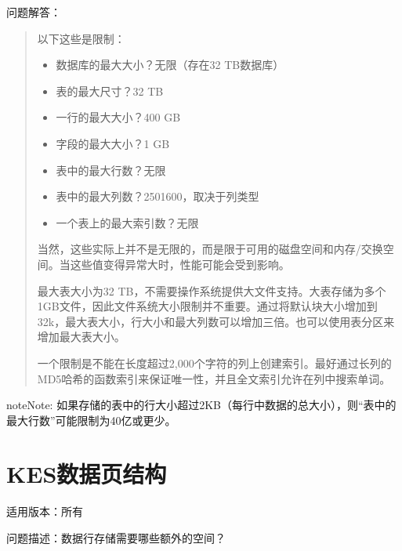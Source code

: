 \documentclass[a4,10pt,oneside,english]{sphinxmanual}
\begin{document}
问题解答：
\begin{quote}

以下这些是限制：
\begin{itemize}
\item {} 
数据库的最大大小？无限（存在32 TB数据库）

\item {} 
表的最大尺寸？32 TB

\item {} 
一行的最大大小？400 GB

\item {} 
字段的最大大小？1 GB

\item {} 
表中的最大行数？无限

\item {} 
表中的最大列数？250\sphinxhyphen{}1600，取决于列类型

\item {} 
一个表上的最大索引数？无限

\end{itemize}

当然，这些实际上并不是无限的，而是限于可用的磁盘空间和内存/交换空间。当这些值变得异常大时，性能可能会受到影响。

最大表大小为32 TB，不需要操作系统提供大文件支持。大表存储为多个1GB文件，因此文件系统大小限制并不重要。通过将默认块大小增加到32k，最大表大小，行大小和最大列数可以增加三倍。也可以使用表分区来增加最大表大小。

一个限制是不能在长度超过2,000个字符的列上创建索引。最好通过长列的MD5哈希的函数索引来保证唯一性，并且全文索引允许在列中搜索单词。
\end{quote}

\begin{sphinxadmonition}{note}{Note:}
如果存储的表中的行大小超过2KB（每行中数据的总大小），则“表中的最大行数”可能限制为40亿或更少。
\end{sphinxadmonition}


\section{KES数据页结构}
\label{\detokenize{sql:kes}}
适用版本：所有

问题描述：数据行存储需要哪些额外的空间？
\end{document}
